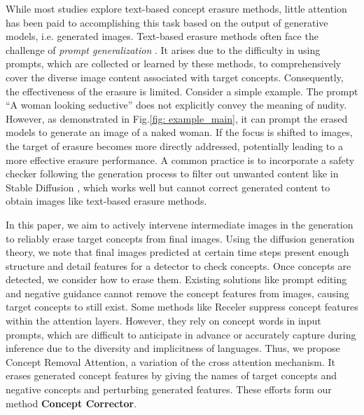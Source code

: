 While most studies explore text-based concept erasure methods, little attention has been paid to accomplishing this task based on the output of generative models, i.e. generated images. Text-based erasure methods often face the challenge of \emph{prompt generalization} \cite{tsai2023ring, zhang2023generate, yang2024mma, chin2023prompting4debugging}. It arises due to the difficulty in using prompts, which are collected or learned by these methods, to comprehensively cover the diverse image content associated with target concepts. Consequently, the effectiveness of the erasure is limited. Consider a simple example. The prompt ``A woman looking seductive'' does not explicitly convey the meaning of nudity. However, as demonstrated in Fig.\ref{fig: example_main}, it can prompt the erased models to generate an image of a naked woman. If the focus is shifted to images, the target of erasure becomes more directly addressed, potentially leading to a more effective erasure performance. A common practice is to incorporate a safety checker following the generation process to filter out unwanted content like in Stable Diffusion \cite{rombach2022high}, which works well but cannot correct generated content to obtain images like text-based erasure methods. 

In this paper, we aim to actively intervene intermediate images in the generation to reliably erase target concepts from final images. Using the diffusion generation theory, we note that final images predicted at certain time steps present enough structure and detail features for a detector to check concepts. Once concepts are detected, we consider how to erase them. Existing solutions like prompt editing \cite{hertzprompt} and negative guidance \cite{ho2021classifier, schramowski2023safe} cannot remove the concept features from images, causing target concepts to still exist. Some methods like Receler \cite{huang2023receler} suppress concept features within the attention layers. However, they rely on concept words in input prompts, which are difficult to anticipate in advance or accurately capture during inference due to the diversity and implicitness of languages. Thus, we propose Concept Removal Attention, a variation of the cross attention mechanism. It erases generated concept features by giving the names of target concepts and negative concepts and perturbing generated features. These efforts form our method \textbf{Concept Corrector}. 

